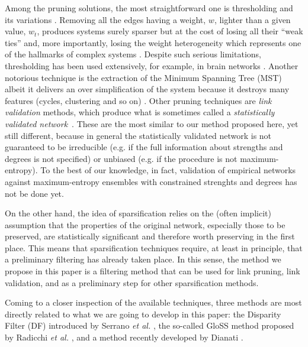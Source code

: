 \documentclass[aps,twocolumn,superscriptaddress]{revtex4-1}
\newcommand{\etal}{\emph{et al.} }
\newcommand{\gloss}{GloSS }
\begin{document}
Among the pruning solutions, the most straightforward one is
thresholding and its variations \cite{de_vico_fallani-pcompbio-2017}. Removing all the edges having a weight, $w$, lighter than a given value, $w_t$, produces systems surely sparser but at the cost of losing all their ``weak ties'' \cite{granovetter-ajsoc-1973} and, more importantly, losing the weight heterogeneity which represents one of the hallmarks of complex systems \cite{barrat-pnas-2004}. Despite such serious limitations, thresholding has been used extensively, for example, in brain networks \cite{bullmore-nat_rev_neuro-2009}. Another notorious technique is the extraction of the Minimum Spanning Tree (MST) albeit it delivers an over simplification of the system because it destroys many features (cycles, clustering and so on) \cite{kruskal-pamsoc-1956, macdonald-epl-2005, scellato-epjb-2006}. 
Other pruning techniques are \emph{link validation} methods, which produce what is sometimes called a \emph{statistically validated network}~\cite{tumminello-pone-2011}.
These are the most similar to our method proposed here, yet still different, because in general the statistically validated network is not guaranteed to be irreducible (e.g. if the full information about strengths and degrees is not specified) or unbiased (e.g. if the procedure is not maximum-entropy).
To the best of our knowledge, in fact, validation of empirical networks against maximum-entropy ensembles with constrained strenghts and degrees has not be done yet.

On the other hand, the idea of sparsification relies on the (often implicit) assumption that the properties of the original network, especially those to be preserved, are statistically significant and therefore worth preserving in the first place.
This means that sparsification techniques require, at least in principle, that a preliminary filtering has already taken place.
In this sense, the method we propose in this paper is a filtering method that can be used for link pruning, link validation, and as a preliminary step for other sparsification methods.


Coming to a closer inspection of the available techniques, three methods are most directly related to what we are going to develop in this paper: the Disparity Filter (DF) introduced by Serrano \etal \cite{serrano-pnas-2009}, the so-called \gloss method proposed by Radicchi \etal \cite{radicchi-pre-2011}, and a method recently developed by Dianati \cite{dianati-pre-2016}.
\end{document}
